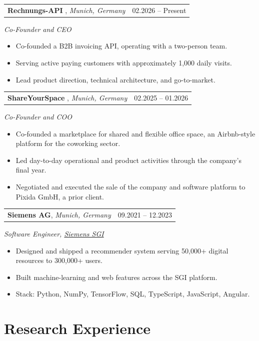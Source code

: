 \documentclass[11pt,a4paper]{article}
\makeatletter
\newcommand{\cventry}[3]{%
    \begin{tabularx}{\textwidth}{@{}Xr@{}}
        \textbf{#1}, \textit{#2} & #3 \\
    \end{tabularx}%
    \vspace{-0.35em}\par%
}
\makeatother
\begin{document}
\vspace{0.25em}
\cventry{Rechnungs-API \normalfont{\small(\href{https://www.rechnungs-api.de}{rechnungs-api.de})}}{Munich, Germany}{02.2026 -- Present}
\textit{Co-Founder and CEO}
\begin{itemize}
    \item Co-founded a B2B invoicing API, operating with a two-person team.
    \item Serving active paying customers with approximately 1{,}000 daily visits.
    \item Lead product direction, technical architecture, and go-to-market.
\end{itemize}

\vspace{0.25em}
\cventry{ShareYourSpace \normalfont{\small(\href{https://www.shareyourspace.com}{shareyourspace.com})}}{Munich, Germany}{02.2025 -- 01.2026}
\textit{Co-Founder and COO}
\begin{itemize}
    \item Co-founded a marketplace for shared and flexible office space, an Airbnb-style platform for the coworking sector.
    \item Led day-to-day operational and product activities through the company's final year.
    \item Negotiated and executed the sale of the company and software platform to Pixida GmbH, a prior client.
\end{itemize}

\vspace{0.25em}
\cventry{Siemens AG}{Munich, Germany}{09.2021 -- 12.2023}
\textit{Software Engineer, \href{https://sgi.siemens.com/home}{Siemens SGI}}
\begin{itemize}
    \item Designed and shipped a recommender system serving 50{,}000+ digital resources to 300{,}000+ users.
    \item Built machine-learning and web features across the SGI platform.
    \item Stack: Python, NumPy, TensorFlow, SQL, TypeScript, JavaScript, Angular.
\end{itemize}

\section*{Research Experience}
\end{document}
